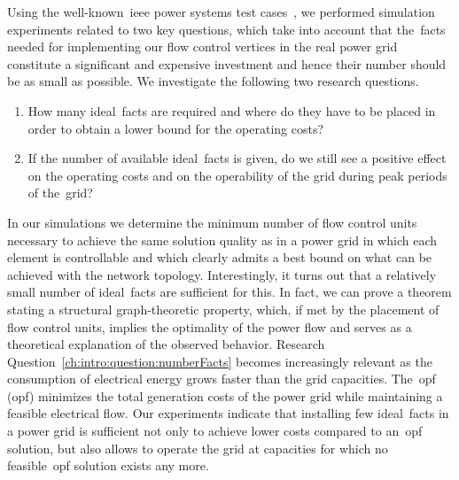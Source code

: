 Using the well-known~\gls{ieee} power systems test
cases~\parencite{online:IEEEtestData,Zimmerman2011a,4075418,Bil70,online:TheUniversityOfEdinburgh:SchoolOfMathematics:PowerSystemsTestCaseArchive,
crow2015computational,Dem77,Gra03,780914,Jos16,6120344,5589973,4113721,Woo13},
we performed simulation experiments related to two key questions, which take
into account that the~\gls{facts} needed for implementing our flow control
vertices in the real power grid constitute a significant and expensive
investment and hence their number should be as small as possible. We investigate
the following two research questions. 
% 
\begin{enumerate}[(Q1)]
    \label{ch:intro:facts:researchQuestion}
    \item How many ideal~\acrshort{facts} are required and where do they have to
    be placed in order to obtain a lower bound for the operating costs?
    \label{ch:intro:question:numberFacts}
    \item If the number of available ideal~\gls{facts} is given, do we still see
    a positive effect on the operating costs and on the operability of the grid
    during peak periods of the~grid?
    \label{ch:intro:question:costsOperability}
\end{enumerate}
% 
In our simulations we determine the minimum number of flow control units
necessary to achieve the same solution quality as in a power grid in which each
element is controllable and which clearly admits a best bound on what can be
achieved with the network topology. Interestingly, it turns out that a
relatively small number of ideal~\gls{facts} are sufficient for this. In fact,
we can prove a theorem stating a structural graph-theoretic property, which, if
met by the placement of flow control units, implies the optimality of the power
flow and serves as a theoretical explanation of the observed behavior. Research
Question~\ref{ch:intro:question:numberFacts} becomes increasingly relevant as
the consumption of electrical energy grows faster than the grid capacities.
The~\acrlong{opf} (\gls{opf}) minimizes the total generation costs of the power
grid while maintaining a feasible electrical flow. Our experiments indicate that
installing few ideal~\gls{facts} in a power grid is sufficient not only to
achieve lower costs compared to an~\gls{opf} solution, but also allows to
operate the grid at capacities for which no feasible~\gls{opf} solution exists
any more.
% 
